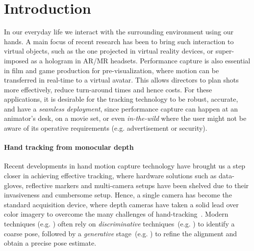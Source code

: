 \section{Introduction}
In our everyday life we interact with the surrounding environment using our hands. A main focus of recent research has been to bring such interaction to virtual objects, such as the one projected in virtual reality devices, %
or super-imposed as a hologram in AR/MR headsets. 
Performance capture is also essential in film and game production for pre-visualization, where motion can be transferred in real-time to a virtual avatar. This allows directors to plan shots more effectively, reduce turn-around times and hence costs.
For these applications, it is desirable for the tracking technology to be robust, accurate, and have a \emph{seamless deployment}, since performance capture can happen at an animator's desk, on a movie set, or even \emph{in-the-wild} where the user might not be aware of its operative requirements (e.g. advertisement or security).

\paragraph{Hand tracking from monocular depth}
Recent developments in hand motion capture technology have brought us a step closer in achieving effective tracking, where hardware solutions such as data-gloves, reflective markers and multi-camera setups have been shelved due to their invasiveness and cumbersome setup.
Hence, a single camera has become the standard acquisition device, where depth cameras  have taken a solid lead over color imagery to overcome the many challenges of hand-tracking~\cite{supancic2015depth}. 
Modern techniques (e.g. \cite{taylor2016joint}) often rely on \emph{discriminative} techniques~(e.g. \cite{valentin2016learning}) to identify a coarse pose, followed by a \emph{generative} stage~(e.g. \cite{tkach2016sphere}) to refine the alignment and obtain a precise pose estimate.


